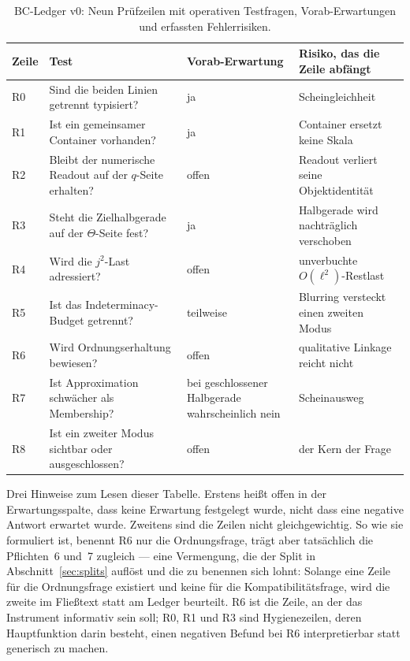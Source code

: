 \documentclass[11pt,a4paper]{article}
\theoremstyle{definition}
\begin{document}
\begin{table}[htbp]
\centering
\small
\renewcommand{\arraystretch}{1.12}
\begin{tabular}{@{}lP{0.38\textwidth}P{0.17\textwidth}P{0.28\textwidth}@{}}
\toprule
Zeile & Test & Vorab-Erwartung & Risiko, das die Zeile abfängt \\
\midrule
R0 & Sind die beiden Linien getrennt typisiert? & ja & Scheingleichheit \\
R1 & Ist ein gemeinsamer Container vorhanden? & ja & Container ersetzt keine Skala \\
R2 & Bleibt der numerische Readout auf der $q$-Seite erhalten? & offen & Readout verliert seine Objektidentität \\
R3 & Steht die Zielhalbgerade auf der $\Theta$-Seite fest? & ja & Halbgerade wird nachträglich verschoben \\
R4 & Wird die $j^2$-Last adressiert? & offen & unverbuchte $O(\ell^2)$-Restlast \\
R5 & Ist das Indeterminacy-Budget getrennt? & teilweise & Blurring versteckt einen zweiten Modus \\
R6 & Wird Ordnungserhaltung bewiesen? & offen & qualitative Linkage reicht nicht \\
R7 & Ist Approximation schwächer als Membership? & bei geschlossener Halbgerade wahrscheinlich nein & Scheinausweg \\
R8 & Ist ein zweiter Modus sichtbar oder ausgeschlossen? & offen & der Kern der Frage \\
\bottomrule
\end{tabular}
\caption{BC-Ledger v0: Neun Prüfzeilen mit operativen Testfragen, Vorab-Erwartungen und erfassten Fehlerrisiken.}
\label{tab:bc_ledger_rows}
\end{table}

Drei Hinweise zum Lesen dieser Tabelle. Erstens heißt \glqq offen\grqq{} in der
Erwartungsspalte, dass keine Erwartung festgelegt wurde, nicht dass eine negative
Antwort erwartet wurde. Zweitens sind die Zeilen nicht gleichgewichtig. So wie sie
formuliert ist, benennt R6 nur die Ordnungsfrage, trägt aber tatsächlich die
Pflichten~6 und~7 zugleich --- eine Vermengung, die der Split in
Abschnitt~\ref{sec:splits} auflöst und die zu benennen sich lohnt: Solange eine
Zeile für die Ordnungsfrage existiert und keine für die Kompatibilitätsfrage,
wird die zweite im Fließtext statt am Ledger beurteilt. R6 ist die Zeile, an der
das Instrument informativ sein soll; R0, R1 und R3 sind Hygienezeilen, deren
Hauptfunktion darin besteht, einen negativen Befund bei R6 interpretierbar statt
generisch zu machen.
\end{document}
